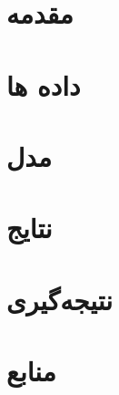 \documentclass[11pt, fleqn]{article}
\begin{document}
\begin{multicols}{2}

\section{مقدمه}





\section{داده ها}







\section{مدل‌}




\section{نتایج}




\section{نتیجه‌گیری}



\end{multicols}


\section{منابع}



\newhline



\end{document}
